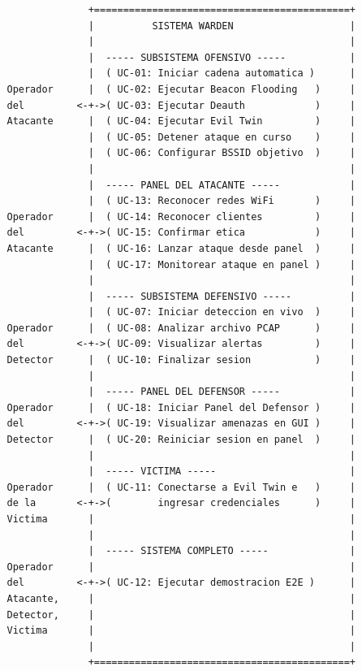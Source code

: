 \documentclass[11pt,a4paper]{article}
\begin{document}
\vspace{0.3cm}
\begin{verbatim}
                 +============================================+
                 |          SISTEMA WARDEN                    |
                 |                                            |
                 |  ----- SUBSISTEMA OFENSIVO -----           |
                 |  ( UC-01: Iniciar cadena automatica )      |
   Operador      |  ( UC-02: Ejecutar Beacon Flooding   )     |
   del         <-+->( UC-03: Ejecutar Deauth            )     |
   Atacante      |  ( UC-04: Ejecutar Evil Twin         )     |
                 |  ( UC-05: Detener ataque en curso    )     |
                 |  ( UC-06: Configurar BSSID objetivo  )     |
                 |                                            |
                 |  ----- PANEL DEL ATACANTE -----            |
                 |  ( UC-13: Reconocer redes WiFi       )     |
   Operador      |  ( UC-14: Reconocer clientes         )     |
   del         <-+->( UC-15: Confirmar etica            )     |
   Atacante      |  ( UC-16: Lanzar ataque desde panel  )     |
                 |  ( UC-17: Monitorear ataque en panel )     |
                 |                                            |
                 |  ----- SUBSISTEMA DEFENSIVO -----          |
                 |  ( UC-07: Iniciar deteccion en vivo  )     |
   Operador      |  ( UC-08: Analizar archivo PCAP      )     |
   del         <-+->( UC-09: Visualizar alertas         )     |
   Detector      |  ( UC-10: Finalizar sesion           )     |
                 |                                            |
                 |  ----- PANEL DEL DEFENSOR -----            |
   Operador      |  ( UC-18: Iniciar Panel del Defensor )     |
   del         <-+->( UC-19: Visualizar amenazas en GUI )     |
   Detector      |  ( UC-20: Reiniciar sesion en panel  )     |
                 |                                            |
                 |  ----- VICTIMA -----                       |
   Operador      |  ( UC-11: Conectarse a Evil Twin e   )     |
   de la       <-+->(        ingresar credenciales      )     |
   Victima       |                                            |
                 |                                            |
                 |  ----- SISTEMA COMPLETO -----              |
   Operador      |                                            |
   del         <-+->( UC-12: Ejecutar demostracion E2E )      |
   Atacante,     |                                            |
   Detector,     |                                            |
   Victima       |                                            |
                 |                                            |
                 +============================================+
\end{verbatim}
\end{document}
